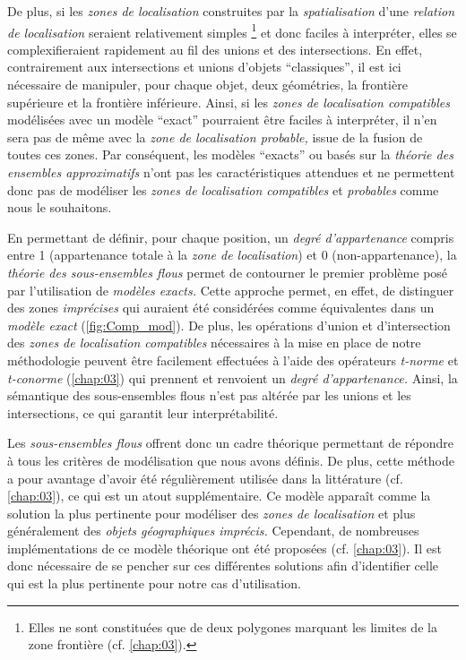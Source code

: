De plus, si les \emph{zones de localisation} construites par la
\emph{spatialisation} d'une \emph{relation de localisation} seraient
relativement simples \footnote{Elles ne sont constituées que de deux
  polygones marquant les limites de la zone frontière
  (cf. \autoref{chap:03}).} et donc faciles à interpréter, elles se
complexifieraient rapidement au fil des unions et des
intersections. En effet, contrairement aux intersections et unions
d'objets \enquote{classiques}, il est ici nécessaire de manipuler,
pour chaque objet, deux géométries, la frontière supérieure et la
frontière inférieure. Ainsi, si les \emph{zones de localisation
  compatibles} modélisées avec un modèle \enquote{exact} pourraient
être faciles à interpréter, il n'en sera pas de même avec la
\emph{zone de localisation probable,} issue de la fusion de toutes ces
zones. Par conséquent, les modèles \enquote{exacts} ou basés sur la
\emph{théorie des ensembles approximatifs} n'ont pas les
caractéristiques attendues et ne permettent donc pas de modéliser les
\emph{zones de localisation compatibles} et \emph{probables} comme
nous le souhaitons.

En permettant de définir, pour chaque position, un \emph{degré
  d'appartenance} compris entre 1 (appartenance totale à la \emph{zone
  de localisation}) et 0 (non-appartenance), la \emph{théorie des
  sous-ensembles flous} permet de contourner le premier problème posé
par l'utilisation de \emph{modèles exacts.} Cette approche permet, en
effet, de distinguer des zones \emph{imprécises} qui auraient été
considérées comme équivalentes dans un \emph{modèle exact}
(\autoref{fig:Comp_mod}). De plus, les opérations d'union et
d'intersection des \emph{zones de localisation compatibles}
nécessaires à la mise en place de notre méthodologie peuvent être
facilement effectuées à l'aide des opérateurs \emph{t-norme} et
\emph{t-conorme} (\autoref{chap:03}) qui prennent et renvoient un
\emph{degré d'appartenance.} Ainsi, la sémantique des sous-ensembles
flous n'est pas altérée par les unions et les intersections, ce qui
garantit leur interprétabilité.

Les \emph{sous-ensembles flous} offrent donc un cadre théorique
permettant de répondre à tous les critères de modélisation que nous
avons définis. De plus, cette méthode a pour avantage d'avoir été
régulièrement utilisée dans la littérature (cf. \autoref{chap:03}), ce
qui est un atout supplémentaire. Ce modèle apparaît comme la solution
la plus pertinente pour modéliser des \emph{zones de localisation} et
plus généralement des \emph{objets géographiques imprécis.} Cependant,
de nombreuses implémentations de ce modèle théorique ont été proposées
(cf. \autoref{chap:03}). Il est donc nécessaire de se pencher sur ces
différentes solutions afin d'identifier celle qui est la plus
pertinente pour notre cas d'utilisation.

